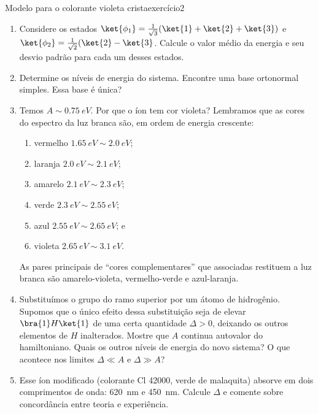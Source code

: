 \begin{exercício}{Modelo para o colorante violeta crista}{exercício2}
\begin{enumerate}[label=(\alph*)]
        \item Considere os estados \(\ket{\phi_1} = \frac{1}{\sqrt{3}} (\ket{1} + \ket{2} + \ket{3})\) e \(\ket{\phi_2} = \frac1{\sqrt{2}} (\ket{2} - \ket{3}\). Calcule o valor médio da energia e seu desvio padrão para cada um desses estados.
        \item Determine os níveis de energia do sistema. Encontre uma base ortonormal simples. Essa base é única?
    \item Temos \(A \sim \SI{0.75}{eV}.\) Por que o íon tem cor violeta? Lembramos que as cores do espectro da luz branca são, em ordem de energia crescente:
        \begin{enumerate}[label=(\roman*)]
            \item vermelho \(\SI{1.65}{eV} \sim \SI{2.0}{eV}\);
            \item laranja \(\SI{2.0}{eV} \sim \SI{2.1}{eV}\);
            \item amarelo \(\SI{2.1}{eV} \sim \SI{2.3}{eV}\);
            \item verde \(\SI{2.3}{eV} \sim \SI{2.55}{eV}\);
            \item azul \(\SI{2.55}{eV} \sim \SI{2.65}{eV}\); e
            \item violeta \(\SI{2.65}{eV} \sim \SI{3.1}{eV}\).
        \end{enumerate}
        As pares principais de \enquote{cores complementares} que associadas restituem a luz branca são amarelo-violeta, vermelho-verde e azul-laranja.
    \item Substituímos o grupo  do ramo superior por um átomo de hidrogênio. Supomos que o único efeito dessa substituição seja de elevar \(\bra{1}H\ket{1}\) de uma certa quantidade \(\Delta > 0\), deixando os outros elementos de \(H\) inalterados. Mostre que \(A\) continua autovalor do hamiltoniano. Quais os outros níveis de energia do novo sistema? O que acontece nos limites \(\Delta \ll A\) e \(\Delta \gg A\)?
    \item Esse íon modificado (colorante Cl 42000, verde de malaquita) absorve em dois comprimentos de onda: \SI{620}{nm} e \SI{450}{nm}. Calcule \(\Delta\) e comente sobre concordância entre teoria e experiência.
    \end{enumerate}
\end{exercício}
